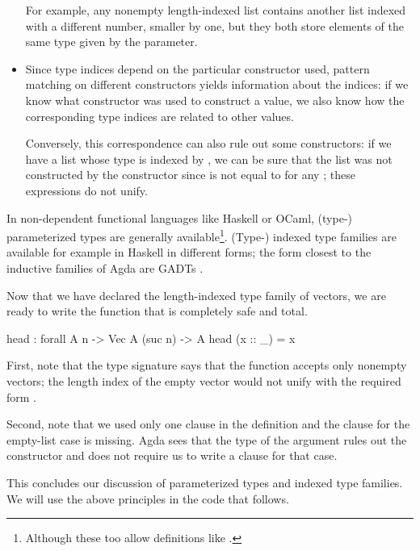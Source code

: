 \begin{itemize}
		For example, any nonempty length-indexed list
		contains another list indexed with a different number, smaller by one, but they
		both store elements of the same type given by the parameter.
		
	\item Since type indices depend on the particular constructor used, pattern matching
		on different constructors yields information about the indices: if we know
		what constructor was used to construct a value, we also know how the corresponding
		type indices are related to other values.
		
		Conversely, this correspondence can
		also rule out some constructors: if we have a list whose type is indexed by ,
		we can be sure that the list was not constructed by the constructor \ident{\_::\_}
		since  is not equal to  for any ; these expressions
		do not unify.
		
\end{itemize}
In non-dependent functional languages like Haskell or OCaml, (type-) parameterized
types are generally available\footnote{Although these too allow definitions like
.}. (Type-) indexed type
families are available for example in Haskell in different forms; the form closest to
the inductive families of Agda are GADTs \cite[p.~178]{haskell-manual}.

Now that we have declared the length-indexed type family of vectors, we are ready to write
the function  that is completely safe and total.
\begin{code}
  head : forall {A n} -> Vec A (suc n) -> A
  head (x :: _) = x
\end{code}

First, note that the type signature says that the function accepts only nonempty vectors;
the length index  of the empty vector would not unify with the required form
.

Second, note that we used only one clause in the definition and the clause for the empty-list
case is missing. Agda sees that the type of the argument rules out the constructor \ident{[\,]}
and does not require us to write a clause for that case.

This concludes our discussion of parameterized types and indexed type families. We will use
the above principles in the code that follows.

